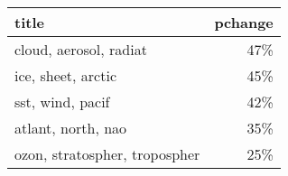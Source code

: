 \begin{tabular}{lr}
\toprule
                         title &  pchange \\
\midrule
        cloud, aerosol, radiat &      47\% \\
            ice, sheet, arctic &      45\% \\
              sst, wind, pacif &      42\% \\
            atlant, north, nao &      35\% \\
 ozon, stratospher, tropospher &      25\% \\
\bottomrule
\end{tabular}
